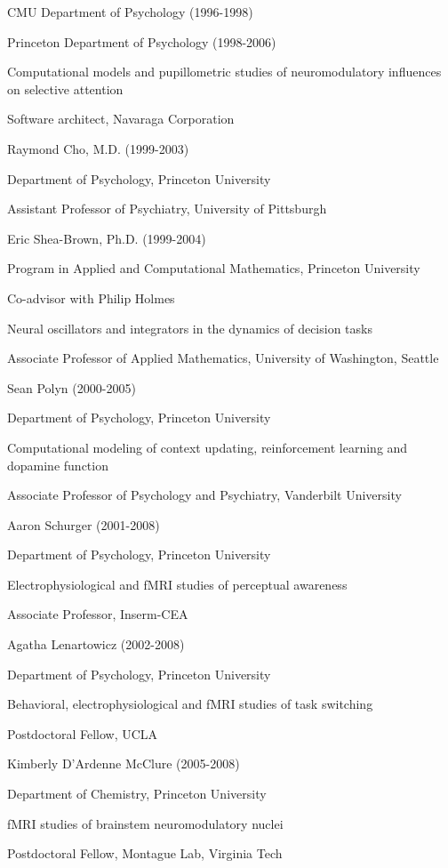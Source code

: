 \documentclass[10 pt]{article}
\begin{document}
CMU Department of Psychology (1996-1998)

Princeton Department of Psychology (1998-2006)

Computational models and pupillometric studies of neuromodulatory influences on selective attention

Software architect, Navaraga Corporation
    \medskip

Raymond Cho, M.D. (1999-2003)

Department of Psychology, Princeton University

Assistant Professor of Psychiatry, University of Pittsburgh
    \medskip

Eric Shea-Brown, Ph.D. (1999-2004)

Program in Applied and Computational Mathematics, Princeton University

Co-advisor with Philip Holmes

Neural oscillators and integrators in the dynamics of decision tasks

Associate Professor of Applied Mathematics, University of Washington, Seattle
    \medskip

Sean Polyn (2000-2005)

Department of Psychology, Princeton University

Computational modeling of context updating, reinforcement learning and dopamine function

Associate Professor of Psychology and Psychiatry, Vanderbilt University
    \medskip

Aaron Schurger (2001-2008)

Department of Psychology, Princeton University

Electrophysiological and fMRI studies of perceptual awareness

Associate Professor, Inserm-CEA
    \medskip

Agatha Lenartowicz (2002-2008)

Department of Psychology, Princeton University

Behavioral, electrophysiological and fMRI studies of task switching

Postdoctoral Fellow, UCLA
    \medskip

Kimberly D’Ardenne McClure (2005-2008)

Department of Chemistry, Princeton University

fMRI studies of brainstem neuromodulatory nuclei

Postdoctoral Fellow, Montague Lab, Virginia Tech
    \medskip
\end{document}
